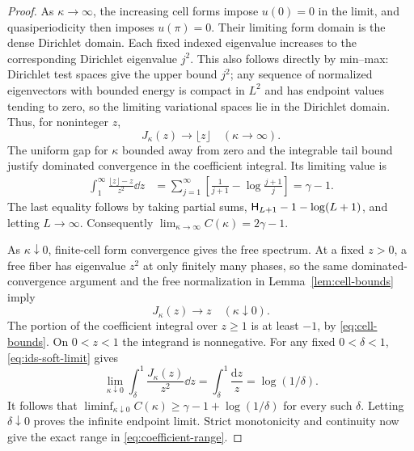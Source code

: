 \begin{proof}
As $\kappa\to\infty$, the increasing cell forms impose
$u(0)=0$ in the limit, and quasiperiodicity then imposes
$u(\pi)=0$. Their limiting form domain is the dense
Dirichlet domain. Each fixed indexed eigenvalue increases
to the corresponding Dirichlet eigenvalue $j^2$.
This also follows directly by min--max: Dirichlet test
spaces give the upper bound $j^2$; any sequence of normalized
eigenvectors with bounded energy is compact in $L^2$ and
has endpoint values tending to zero, so the limiting
variational spaces lie in the Dirichlet domain.
Thus, for noninteger $z$,
\begin{equation}
 J_\kappa(z)\longrightarrow\lfloor z\rfloor
                         \quad(\kappa\to\infty).
 \label{eq:ids-hard-limit}
\end{equation}
The uniform gap for $\kappa$ bounded away from zero and
the integrable tail bound justify dominated convergence
in the coefficient integral. Its limiting value is
\begin{align}
 \int_1^\infty\frac{\lfloor z\rfloor-z}{z^2}\dd z
 &=\sum_{j=1}^\infty
         \left[\frac1{j+1}-\log\frac{j+1}{j}\right]
   =\gamma-1.
 \label{eq:dirichlet-integral}
\end{align}
The last equality follows by taking partial sums,
$\mathsf H_{L+1}-1-\log(L+1)$, and letting $L\to\infty$.
Consequently $\lim_{\kappa\to\infty}C(\kappa)=2\gamma-1$.

As $\kappa\downarrow0$, finite-cell form convergence
gives the free spectrum. At a fixed $z>0$, a free fiber
has eigenvalue $z^2$ at only finitely many phases, so
the same dominated-convergence argument and the free
normalization in Lemma~\ref{lem:cell-bounds} imply
\begin{equation}
 J_\kappa(z)\longrightarrow z
                           \quad(\kappa\downarrow0).
 \label{eq:ids-soft-limit}
\end{equation}
The portion of the coefficient integral over $z\ge1$
is at least $-1$, by \eqref{eq:cell-bounds}. On
$0<z<1$ the integrand is nonnegative. For any fixed
$0<\delta<1$, \eqref{eq:ids-soft-limit} gives
\[
 \lim_{\kappa\downarrow0}\int_\delta^1
                \frac{J_\kappa(z)}{z^2}\dd z
             =\int_\delta^1\frac{\mathrm dz}{z}
             =\log(1/\delta).
\]
It follows that
$\liminf_{\kappa\downarrow0}C(\kappa)
\ge\gamma-1+\log(1/\delta)$ for every such $\delta$.
Letting $\delta\downarrow0$ proves the infinite endpoint
limit. Strict monotonicity and continuity now give the
exact range in \eqref{eq:coefficient-range}.
\end{proof}
